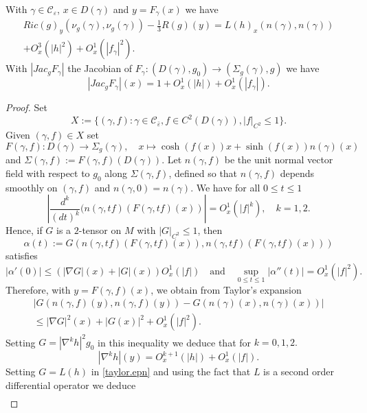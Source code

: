 \documentclass[10pt,a4paper]{amsart}
\begin{document}
	\begin{prop}\label{asymptotic.expn}
		With $\gamma\in \mathcal C_{\varepsilon}$, $x\in D(\gamma)$ and $y=F_{\gamma}(x)$ we have
		\begin{multline*}Ric(g)_y(\nu_g(\gamma),\nu_g(\gamma))-\frac{1}{3}R(g)(y)=L(h)_x(n(\gamma),n(\gamma))\\ +O^3_x(|h|^2)+O^1_x(|f_{\gamma}|^2).
		\end{multline*}
		With $|Jac_g F_{\gamma}|$ the Jacobian of $F_{\gamma}:(D(\gamma),g_0)\rightarrow (\Sigma_{g}(\gamma),g)$ we have
		$$|Jac_g F_{\gamma}|(x)=1+O_x^1(|h|)+O_x^1(|f_{\gamma}|).$$
	\end{prop}

	\begin{proof}
		Set $$X:=\{(\gamma,f):\gamma\in\mathcal C_{\bar \varepsilon}, f\in C^2(D(\gamma)), |f|_{C^2}\leq 1\}.$$
		Given $(\gamma,f)\in X$ set
		\begin{equation*}
			F(\gamma,f): D(\gamma)\rightarrow \Sigma_{g}(\gamma),\quad x\mapsto \cosh(f(x))x+\sinh(f(x))n(\gamma)(x)
		\end{equation*}
		and $\Sigma(\gamma,f):=F(\gamma,f)(D(\gamma))$. Let $n(\gamma,f)$ be the unit normal vector field with respect to $g_0$ along $\Sigma(\gamma,f)$, defined so that $n(\gamma,f)$ depends smoothly on $(\gamma,f)$ and $n(\gamma,0)=n(\gamma)$.
		We have for all $0\leq t\leq 1$
		$$\left|\frac{d^k}{(dt)^k}(n(\gamma,tf)(F(\gamma,tf)(x))\right|=O_x^1(|f|^k), \quad k=1,2.$$
		Hence, if $G$ is a $2$-tensor on $M$ with $|G|_{C^2}\leq 1$, then
		$$\alpha(t):=G(n(\gamma,tf)(F(\gamma,tf)(x)),n(\gamma,tf)(F(\gamma,tf)(x)))$$
		satisfies 
		$$|\alpha'(0)|\leq (|\nabla G|(x)+|G|(x))O_x^1(|f|)\quad\mbox{and}\quad \sup_{0\leq t\leq 1}|\alpha''(t)|=O_x^1(|f|^2).$$
		Therefore, with $y=F(\gamma,f)(x)$, we obtain from Taylor's expansion
		\begin{multline}\label{taylor.epn}
			|G(n(\gamma,f)(y),n(\gamma,f)(y))-G(n(\gamma)(x),n(\gamma)(x))|\\
			\leq |\nabla G|^2(x)+|G(x)|^2+O_x^1(|f|^2).
		\end{multline}
		Setting $G=|\nabla^k h|^2g_0$ in this inequality we deduce that for  $k=0,1,2.$
		\begin{equation}\label{base.point}
			|\nabla^k h|(y)=O^{k+1}_x(|h|)+O_x^1(|f|).
		\end{equation}
		Setting  $G=L(h)$ in \eqref{taylor.epn} and using the fact that $L$ is a second order differential operator we deduce
		\begin{multline}\label{expn.Lh}

\end{multline}
\end{proof}
\end{document}
